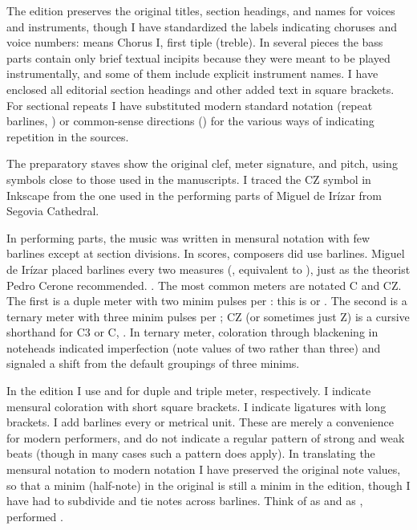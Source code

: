 
The edition preserves the original titles, section headings, and names for
voices and instruments, though I have standardized the labels indicating
choruses and voice numbers:  means Chorus I, first tiple
(treble).
In several pieces the bass parts contain only brief textual incipits because
they were meant to be played instrumentally, and some of them include explicit
instrument names.
I have enclosed all editorial section headings and other added text in square
brackets.
For sectional repeats I have substituted modern standard notation (repeat
barlines, ) or common-sense directions () for the various ways of indicating repetition in the sources.

The preparatory staves show the original clef, meter signature, and pitch,
using symbols close to those used in the manuscripts.
I traced the CZ symbol in Inkscape from the one used in the performing parts
of Miguel de Irízar from Segovia Cathedral.

In performing parts, the music was written in mensural notation with few
barlines except at section divisions.
In scores, composers did use barlines.
Miguel de Irízar placed barlines every two measures (,
equivalent to ), just as the theorist Pedro Cerone recommended.%
    \Autocite[745]{Cerone:Melopeo}.
The most common meters are notated C and CZ.%
    \Autocites
    [537]{Cerone:Melopeo}
    [156, 165, 210]{Lorente:Porque}
    {GonzalezValle:CompasCabezon}
The first is a duple meter with two minim pulses per :
this is  or .
The second is a ternary meter with three minim pulses per ; CZ
(or sometimes just Z) is a cursive shorthand for C3 or C,
.
In ternary meter, coloration through blackening in noteheads indicated
imperfection (note values of two rather than three) and signaled a shift from
the default groupings of three minims.

In the edition I use \meterC{} and \meterCThree{} for duple and triple meter,
respectively.
I indicate mensural coloration with short square brackets.
I indicate ligatures with long brackets.
I add barlines every  or metrical unit.
These are merely a convenience for modern performers, and do not indicate a
regular pattern of strong and weak beats (though in many cases such a pattern
does apply).
In translating the mensural notation to modern notation I have preserved the
original note values, so that a minim (half-note) in the original is still a
minim in the edition, though I have had to subdivide and tie notes across
barlines.
Think of \meterC{} as  and \meterCThree{} as , performed
.


